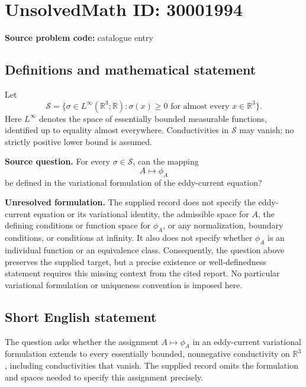 \documentclass[11pt]{article}
\newcommand{\R}{\mathbb{R}}
\begin{document}
\section*{UnsolvedMath ID: 30001994}
\textbf{Source problem code:} catalogue entry
\subsection{Definitions and mathematical statement}
Let
\[
\mathcal S=\{\sigma\in L^\infty(\R^3;\R):\sigma(x)\geq 0\text{ for almost every }x\in\R^3\}.
\]
Here \(L^\infty\) denotes the space of essentially bounded measurable functions, identified up to equality almost everywhere. Conductivities in \(\mathcal S\) may vanish; no strictly positive lower bound is assumed.

\textbf{Source question.} For every \(\sigma\in\mathcal S\), can the mapping
\[
A\longmapsto\phi_A
\]
be defined in the variational formulation of the eddy-current equation?

\textbf{Unresolved formulation.} The supplied record does not specify the eddy-current equation or its variational identity, the admissible space for \(A\), the defining conditions or function space for \(\phi_A\), or any normalization, boundary conditions, or conditions at infinity. It also does not specify whether \(\phi_A\) is an individual function or an equivalence class. Consequently, the question above preserves the supplied target, but a precise existence or well-definedness statement requires this missing context from the cited report. No particular variational formulation or uniqueness convention is imposed here.
\subsection{Short English statement}
The question asks whether the assignment \(A\mapsto\phi_A\) in an eddy-current variational formulation extends to every essentially bounded, nonnegative conductivity on \(\R^3\), including conductivities that vanish. The supplied record omits the formulation and spaces needed to specify this assignment precisely.
\end{document}
